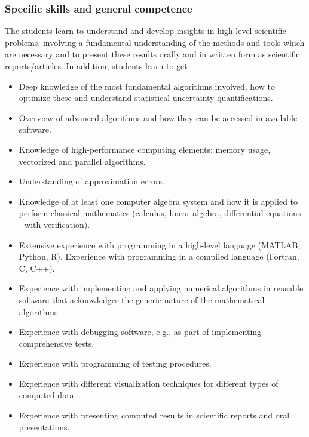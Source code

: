 \documentclass{beamer}
\begin{document}
\begin{frame}
\frametitle{Specific skills and general competence}

\begin{block}{}
The students learn to understand and develop insights in high-level scientific problems, involving a fundamental understanding of the methods and tools which are necessary and to present these results orally and in written form as scientific reports/articles. In addition, students learn to get

\begin{itemize}
\item Deep knowledge of the most fundamental algorithms involved, how to optimize these  and understand statistical uncertainty quantifications.

\item Overview of advanced algorithms and how they can be accessed in available software.

\item Knowledge of high-performance computing elements: memory usage, vectorized and parallel algorithms.

\item Understanding of approximation errors.

\item Knowledge of at least one computer algebra system and how it is applied to perform classical mathematics (calculus, linear algebra, differential equations - with verification).

\item Extensive experience with programming in a high-level language (MATLAB, Python, R). Experience with programming in a compiled language (Fortran, C, C++).

\item Experience with implementing and applying numerical algorithms in reusable software that acknowledges the generic nature of the mathematical algorithms.

\item Experience with debugging software, e.g., as part of implementing comprehensive tests.

\item Experience with programming of testing procedures.

\item Experience with different visualization techniques for different types of computed data.

\item Experience with presenting computed results in scientific reports and oral presentations.


\end{itemize}
\end{block}
\end{frame}
\end{document}
